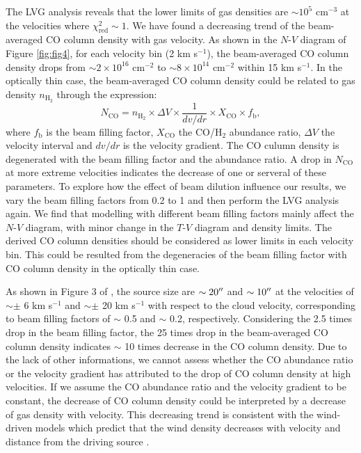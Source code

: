 The LVG analysis reveals that the lower limits of gas densities are $\sim 10^5$ cm$^{-3}$ at the velocities where $\chi^2_{\mathrm{red}} \sim 1$. We have found a decreasing trend of the beam-averaged CO column density with gas velocity. As shown in the $N$-$V$ diagram of Figure \ref{fig:fig4}, for each velocity bin (2 km s$^{-1}$), the beam-averaged CO column density drops from $\sim 2 \times  10^{16} $ cm$^{-2}$ to $\sim 8 \times 10^{14}$ cm$^{-2}$ within 15 km s$^{-1}$. In the optically thin case, the beam-averaged CO column density could be related to gas density $n_{\mathrm{H}_2}$ through the expression: 
\begin{equation}
N_{\mathrm{CO}} = n_{\mathrm{H}_2} \times \Delta V \times \frac{1}{dv/dr} \times X_{\mathrm{CO}} \times f_{\mathrm{b}}, 
\end{equation}
where $f_{\mathrm{b}}$ is the beam filling factor, $X_{\mathrm{CO}}$ the CO/H$_2$ abundance ratio, $\Delta V$ the velocity interval and $dv/dr$ is the velocity gradient. The CO culumn density is degenerated with the beam filling factor and the abundance ratio. A drop in $N_{\mathrm{CO}}$ at more extreme velocities indicates the decrease of one or serveral of these parameters. 
To explore how the effect of beam dilution influence our results, we vary the beam filling factors from 0.2 to 1 and then perform the LVG analysis again. We find that modelling with different beam filling factors mainly affect the $N$-$V$ diagram, with minor change in the $T$-$V$ diagram and density limits. The derived CO column densities should be considered as lower limits in each velocity bin. This could be resulted from the degeneracies of the beam filling factor with CO column density in the optically thin case. 

As shown in Figure 3 of \citet{2009ApJ...696...66Q}, the source size are $\sim 20\mbox{$^{\prime\prime}$}$ and $\sim 10\mbox{$^{\prime\prime}$}$ at the velocities of $\sim \pm$ 6 km s$^{-1}$ and $\sim \pm$ 20 km s$^{-1}$ with respect to the cloud velocity, corresponding to beam filling factors of $\sim$ 0.5 and $\sim$ 0.2, respectively. Considering the 2.5 times drop in the beam filling factor, the 25 times drop in the beam-averaged CO column density indicates $\sim$ 10 times decrease in the CO column density. Due to the lack of other informations, we cannot assess whether the CO abundance ratio or the velocity gradient has attributed to the drop of CO column density at high velocities. If we assume the CO abundance ratio and the velocity gradient to be constant, the decrease of CO column density could be interpreted by a decrease of gas density with velocity. This decreasing trend is consistent with the wind-driven models which predict that the wind density decreases with velocity and distance from the driving source \citep{2007prpl.conf..245A}.
